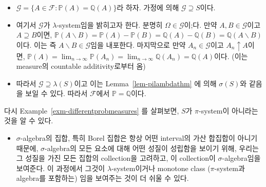 \documentclass[
  13pt,
  letterpaper,
  DIV=11,
  numbers=noendperiod]{scrreprt}
\providecommand{\tightlist}{%
  \setlength{\itemsep}{0pt}\setlength{\parskip}{0pt}}\usepackage{longtable,booktabs,array}
\theoremstyle{plain}
\theoremstyle{definition}
\theoremstyle{definition}
\theoremstyle{plain}
\theoremstyle{definition}
\theoremstyle{plain}
\theoremstyle{remark}
\begin{document}
\begin{tcolorbox}[enhanced jigsaw, opacitybacktitle=0.6, bottomrule=.15mm, title=\textcolor{quarto-callout-note-color}{\faInfo}\hspace{0.5em}{Proof}, leftrule=.75mm, rightrule=.15mm, arc=.35mm, left=2mm, titlerule=0mm, colbacktitle=quarto-callout-note-color!10!white, bottomtitle=1mm, colframe=quarto-callout-note-color-frame, toptitle=1mm, coltitle=black, breakable, colback=white, toprule=.15mm, opacityback=0]

\begin{itemize}
\item
  \(\mathcal{G} =\{A \in \mathcal{F}: \mathbb{P}(A) = \mathbb{Q}(A)\}\)라
  하자. 가정에 의해 \(\mathcal{G} \supseteq S\)이다.
\item
  여기서 \(\mathcal{G}\)가 \(\lambda\)-system임을 밝히고자 한다. 분명히
  \(\Omega \in \mathcal{G}\)이;다. 만약 \(A, B \in \mathcal{G}\)이고
  \(A \supseteq B\)이면,
  \(\mathbb{P}(A\backslash B) = \mathbb{P}(A) - \mathbb{P}(B) = \mathbb{Q}(A) - \mathbb{Q}(B) = \mathbb{Q}(A\backslash B)\)이다.
  이는 즉 \(A \backslash B \in \mathcal{G}\)임을 내포한다. 마지막으로
  만약 \(A_n \in \mathcal{G}\)이고 \(A_n \uparrow A\)이면,
  \(\mathbb{P}(A) = \lim_{n\rightarrow \infty} \mathbb{P}(A_n) = \lim_{n\rightarrow \infty}\mathbb{Q}(A_n) = \mathbb{Q}(A)\)이다.
  (이는 measure의 countable additivity로부터 옴)
\item
  따라서 \(\mathcal{G} \supseteq \lambda (S)\)이고 이는
  Lemma~\ref{lem-pilambdathm} 에 의해 \(\sigma (S)\)와 같음을 보일 수
  있다. 따라서 \(\mathcal{F}\)에서 \(\mathbb{P}= \mathbb{Q}\)이다.
\end{itemize}

\end{tcolorbox}

다시 Example~\ref{exm-differentprobmeasures} 를 살펴보면, \(S\)가
\(\pi\)-system이 아니라는 것을 알 수 있다.

\begin{tcolorbox}[enhanced jigsaw, opacitybacktitle=0.6, bottomrule=.15mm, title=\textcolor{quarto-callout-tip-color}{\faLightbulb}\hspace{0.5em}{Remark}, leftrule=.75mm, rightrule=.15mm, arc=.35mm, left=2mm, titlerule=0mm, colbacktitle=quarto-callout-tip-color!10!white, bottomtitle=1mm, colframe=quarto-callout-tip-color-frame, toptitle=1mm, coltitle=black, breakable, colback=white, toprule=.15mm, opacityback=0]

\begin{itemize}
\tightlist
\item
  \(\sigma\)-algebra의 집합, 특히 Borel 집합은 항상 어떤 interval의 가산
  합집합이 아니기 때문에, \(\sigma\)-algebra의 모든 요소에 대해 어떤
  성질이 성립함을 보이기 위해, 우리는 그 성질을 가진 모든 집합의
  collection을 고려하고, 이 collection이 \(\sigma\)-algebra임을
  보여준다. 이 과정에서 그것이 \(\lambda\)-system이거나 monotone class
  (\(\pi\)-system과 algebra를 포함하는) 임을 보여주는 것이 더 쉬울 수
  있다.
\end{itemize}

\end{tcolorbox}
\end{document}
